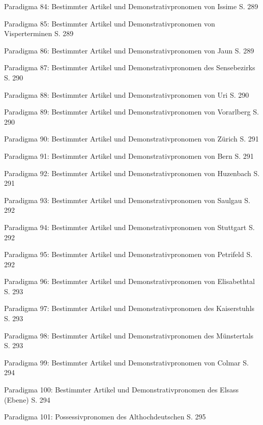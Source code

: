 Paradigma 84: Bestimmter Artikel und Demonstrativpronomen von Issime \citep[4–12, 81]{Perinetto1981}  S. 289

Paradigma 85: Bestimmter Artikel und Demonstrativpronomen von Visperterminen \citep[141]{Wipf1911}  S. 289

Paradigma 86: Bestimmter Artikel und Demonstrativpronomen von Jaun \citep[282–283]{Stucki1917}  S. 289

Paradigma 87: Bestimmter Artikel und Demonstrativpronomen des Sensebezirks \citep[200–201]{Henzen1927}  S. 290

Paradigma 88: Bestimmter Artikel und Demonstrativpronomen von Uri \citep[194–195]{Clauß1929}  S. 290

Paradigma 89: Bestimmter Artikel und Demonstrativpronomen von Vorarlberg \citep[276–279]{Jutz1925}  S. 290

Paradigma 90: Bestimmter Artikel und Demonstrativpronomen von Zürich \citep[101–104, 139–140]{Weber1987}  S. 291

Paradigma 91: Bestimmter Artikel und Demonstrativpronomen von Bern \citep[77–79, 102–103]{Marti1985}  S. 291

Paradigma 92: Bestimmter Artikel und Demonstrativpronomen von Huzenbach \citep[100, 104–105]{Baur1967}  S. 291

Paradigma 93: Bestimmter Artikel und Demonstrativpronomen von Saulgau \citep[115–116, 119–120]{Raichle1932}  S. 292

Paradigma 94: Bestimmter Artikel und Demonstrativpronomen von Stuttgart \citep[154–155]{Frey1975}  S. 292

Paradigma 95: Bestimmter Artikel und Demonstrativpronomen von Petrifeld \citep[63–64, 65]{Moser1937}  S. 292

Paradigma 96: Bestimmter Artikel und Demonstrativpronomen von Elisabethtal \citep[52]{Žirmunskij1928/29}  S. 293

Paradigma 97: Bestimmter Artikel und Demonstrativpronomen des Kaiserstuhls \citep[359–378]{Noth1993}  S. 293

Paradigma 98: Bestimmter Artikel und Demonstrativpronomen des Münstertals \citep[47–48]{Mankel1886}  S. 293

Paradigma 99: Bestimmter Artikel und Demonstrativpronomen von Colmar \citep[68–70, 83]{Henry1900}  S. 294

Paradigma 100: Bestimmter Artikel und Demonstrativpronomen des Elsass (Ebene) \citep[72–78, 84–88]{Beyer1963}  S. 294

Paradigma 101: Possessivpronomen des Althochdeutschen \citep[245–246]{Braune2004}  S. 295

